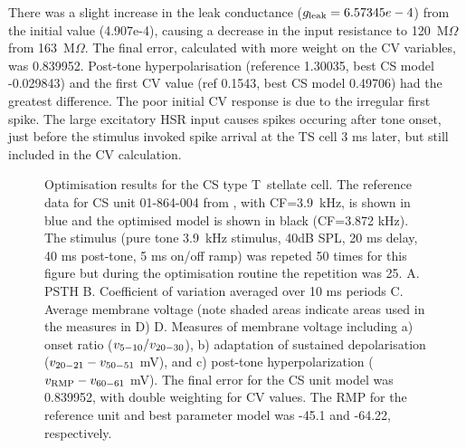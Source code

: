 There was a slight increase in the leak conductance ($g_{\rm leak}= 6.57345e-4$)
from the initial value (4.907e-4), causing a decrease in the input resistance to
120~M$\Omega$ from 163~M$\Omega$. The final error, calculated with more weight
on the CV variables, was 0.839952.  Post-tone hyperpolarisation (reference
1.30035, best CS model -0.029843) and the first CV value (ref 0.1543, best CS
model 0.49706) had the greatest difference. The poor initial CV response is due
to the irregular first spike.  The large excitatory HSR input causes spikes
occuring after tone onset, just before the stimulus invoked spike arrival at the
TS cell 3 ms later, but still included in the CV calculation.





\begin{figure}[htb]
  \centering
  \caption[CS T~stellate Optimisation results]{Optimisation results for the CS
    type T~stellate cell. The reference data for CS unit 01-864-004 from
    \citep{PaoliniClareyEtAl:2005}, with CF=3.9~kHz, is shown in blue and the
    optimised model is shown in black (CF=3.872 kHz). The stimulus (pure tone 3.9~kHz stimulus,
    40dB SPL, 20 ms delay, 40 ms post-tone, 5 ms on/off ramp) was repeted 50
    times for this figure but during the optimisation routine the repetition was
    25. A. PSTH B. Coefficient of variation averaged over 10 ms periods
    C. Average membrane voltage (note shaded areas indicate areas used in the
    measures in D) D. Measures of membrane voltage including a) onset ratio
    ($v_{\rm 5-10}/v_{\rm 20-30}$), b) adaptation of sustained depolarisation
    ($v_{\rm 20-21} - v_{\rm 50-51}$ mV), and c) post-tone hyperpolarization ($v_{\rm
      RMP} - v_{\rm 60-61}$ mV).  The final error for the CS unit model was
    0.839952, with double weighting for CV values. 
    The RMP for the reference unit and best parameter model was -45.1 and
    -64.22, respectively.
}
  \label{fig:CSresults}
\end{figure}

